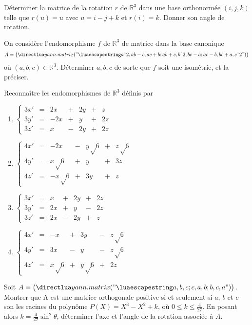 \documentclass{yann}
\begin{document}
Déterminer la matrice de la rotation $r$ de $ℝ^3$ dans une base orthonormée
$(i, j, k)$ telle que $r(u) = u$
avec $u = i - j + k$ et $r(i) = k$.
Donner son angle de rotation.

\Exercice

On considère l'endomorphisme $f$ de $ℝ^3$ de matrice dans la base canonique
\[ A = \Matrix{a^2,ab-c,ac+b;ab+c,b^2,bc-a;ac-b,bc+a,c^2} \]
où $(a,b,c)∈ℝ^3$.
Déterminer $a,b,c$ de sorte que $f$ soit une isométrie, et la préciser.

\Exercice

Reconnaître les endomorphismes de $ℝ^3$ définis par
\begin{enumerate}
\item $\left\{ \begin{alignedat}{4}
  3x' & {}={} & 2x  & {}+{} & 2y & {}+{} & z  \\
  3y' & {}={} & -2x & {}+{} & y  & {}+{} & 2z \\
  3z' & {}={} & x   & {}-{} & 2y & {}+{} & 2z
\end{alignedat} \right.$
\item $\left\{ \begin{alignedat}{4}
  4x' & {}={} & -2x      & {}-{} & y√6 & {}+{} & z√6 \\
  4y' & {}={} & x√6  & {}+{} & y       & {}+{} & 3z      \\
  4z' & {}={} & -x√6 & {}+{} & 3y      & {}+{} & z
\end{alignedat} \right.$
\item $\left\{ \begin{alignedat}{4}
  3x' & {}={} & x  & {}+{} & 2y & {}+{} & 2z \\
  3y' & {}={} & 2x & {}+{} & y  & {}-{} & 2z \\
  3z' & {}={} & 2x & {}-{} & 2y & {}+{} & z
\end{alignedat} \right.$
\item $\left\{ \begin{alignedat}{4}
  4x' & {}={} & -x      & {}+{} & 3y      & {}-{} & z√6       \\
  4y' & {}={} & 3x      & {}-{} & y       & {}-{} & z√6        \\
  4z' & {}={} & x√6 & {}+{} & y√6 & {}+{} & 2z
\end{alignedat} \right.$
\end{enumerate}

\Exercice

Soit $\DS A = \Matrix{a,b,c;c,a,b;b,c,a}$.
Montrer que A est une matrice orthogonale positive
si et seulement si $a$, $b$ et $c$ son les racines du polynôme
$P(X) = X^3 - X^2 + k$, où $0≤k≤\frac{4}{27}$.
En posant alors $k = \frac{4}{27} \sin^2θ$, déterminer l'axe
et l'angle de la rotation associée à $A$.
\end{document}
